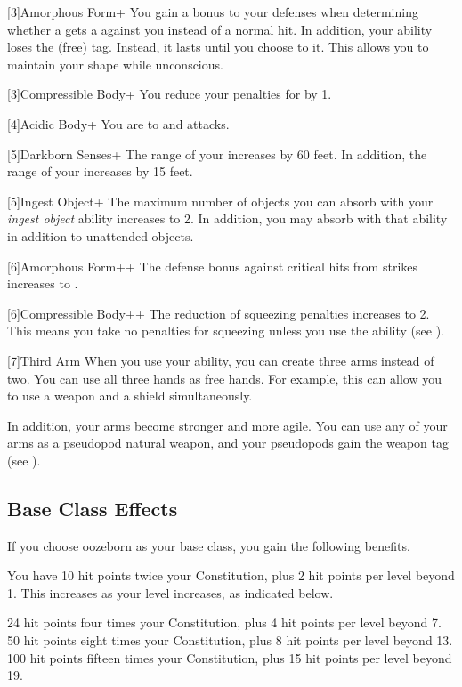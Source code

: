     [3]{Amorphous Form+} You gain a  bonus to your defenses when determining whether a  gets a  against you instead of a normal hit.
      In addition, your  ability loses the  (free) tag.
      Instead, it lasts until you choose to  it.
      This allows you to maintain your shape while unconscious.

    [3]{Compressible Body+} You reduce your penalties for \squeezing by 1.

    [4]{Acidic Body+} You are  to \atAcid and \atPoison attacks.

    [5]{Darkborn Senses+} The range of your  increases by 60 feet.
      In addition, the range of your  increases by 15 feet.

    [5]{Ingest Object+} The maximum number of objects you can absorb with your \textit{ingest object} ability increases to 2.
      In addition, you may absorb  with that ability in addition to unattended objects.

    [6]{Amorphous Form++} The defense bonus against critical hits from strikes increases to .

    [6]{Compressible Body++} The reduction of squeezing penalties increases to 2.
      This means you take no penalties for squeezing unless you use the  ability (see ).

    [7]{Third Arm} When you use your  ability, you can create three arms instead of two.
      You can use all three hands as free hands.
      For example, this can allow you to use a  weapon and a shield simultaneously.

      In addition, your arms become stronger and more agile.
      You can use any of your arms as a pseudopod natural weapon, and your pseudopods gain the  weapon tag (see ).

  \subsection{Base Class Effects}
    \veryhighhpprogressiontable

    If you choose oozeborn as your base class, you gain the following benefits.

      You have 10 hit points \add twice your Constitution, plus 2 hit points per level beyond 1.
      This increases as your level increases, as indicated below.
      \begin{raggeditemize}
         24 hit points \add four times your Constitution, plus 4 hit points per level beyond 7.
         50 hit points \add eight times your Constitution, plus 8 hit points per level beyond 13.
         100 hit points \add fifteen times your Constitution, plus 15 hit points per level beyond 19.
      \end{raggeditemize}

